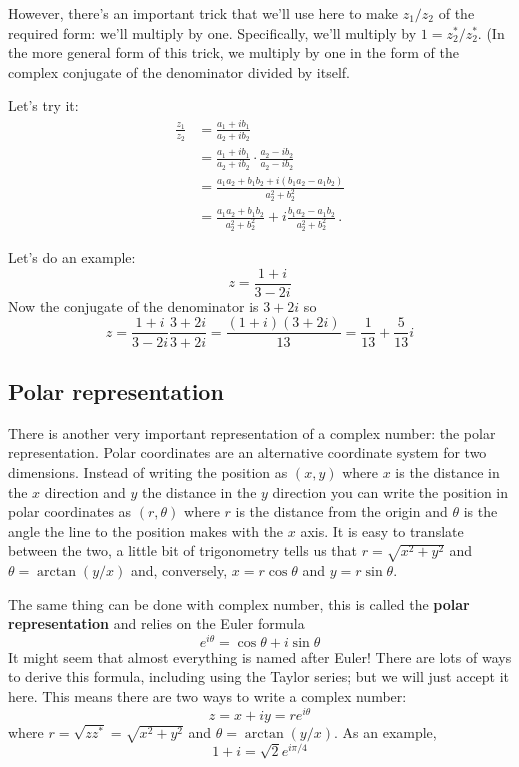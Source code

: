 \documentclass[12pt]{article}
\begin{document}
\begin{itemize}
However, there's an important trick that we'll use here to make $z_1/z_2$ of the required form: we'll multiply by one. Specifically, we'll multiply by $1 = z_2^*/z_2^*$. (In the more general form of this trick, we multiply by one in the form of the complex conjugate of the denominator divided by itself. 

Let's try it:
\begin{align*}
  \frac{z_1}{z_2}&=\frac{a_1 + ib_1}{a_2 + ib_2}\\
  &=\frac{a_1 + ib_1}{a_2 + ib_2}\cdot \frac{a_2 - ib_2}{a_2 -  ib_2} \\
  &= \frac{a_1a_2 + b_1b_2 + i (b_1a_2-a_1b_2)}{a_2^2 +b_2^2}
\\  
&=  \frac{a_1a_2 + b_1b_2}{a_2^2 +b_2^2} + i\frac{b_1a_2-a_1b_2}{a_2^2 +b_2^2}\,.
\end{align*}

Let's do an example:
\begin{equation}
  z=\frac{1+i}{3-2i}
\end{equation}
Now the conjugate of the denominator is $3+2i$ so
\begin{equation}
  z=\frac{1+i}{3-2i}\frac{3+2i}{3+2i}=\frac{(1+i)(3+2i)}{13}=\frac{1}{13}+\frac{5}{13}i
\end{equation}
\end{itemize}

\subsection*{Polar representation}
There is another very important representation of a complex number: the polar representation. Polar coordinates are an
alternative coordinate system for two dimensions. Instead of writing
the position as $(x,y)$ where $x$ is the distance in the $x$ direction
and $y$ the distance in the $y$ direction you can write the position
in polar coordinates as $(r,\theta)$ where $r$ is the distance from
the origin and $\theta$ is the angle the line to the position makes
with the $x$ axis. It is easy to translate between the two, a little bit of trigonometry tells us that $r=\sqrt{x^2+y^2}$ and $\theta=\arctan{(y/x)}$ and, conversely, $x=r\cos{\theta}$ and $y=r\sin{\theta}$.

The same thing can be done with complex number, this is called the \textbf{polar representation} and relies on the Euler formula
\begin{equation}
  e^{i\theta}=\cos{\theta}+i\sin{\theta}
\end{equation}
It might seem that almost everything is named after Euler! There are
lots of ways to derive this formula, including using the Taylor
series; but we will just accept it here. This means there are two ways
to write a complex number:
\begin{equation}
  z=x+iy = re^{i\theta}
\end{equation}
where $r=\sqrt{zz^*}=\sqrt{x^2+y^2}$ and $\theta=\arctan{(y/x)}$. As an example, \begin{equation}
  1+i=\sqrt{2}e^{i\pi/4}
\end{equation}
\end{document}
